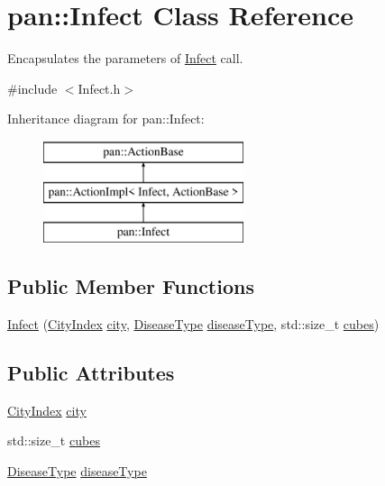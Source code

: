 \hypertarget{classpan_1_1_infect}{}\section{pan\+:\+:Infect Class Reference}
\label{classpan_1_1_infect}


Encapsulates the parameters of \hyperlink{classpan_1_1_infect}{Infect} call.  




{\ttfamily \#include $<$Infect.\+h$>$}

Inheritance diagram for pan\+:\+:Infect\+:\begin{figure}[H]
\begin{center}
\leavevmode
\includegraphics[height=3.000000cm]{classpan_1_1_infect}
\end{center}
\end{figure}
\subsection*{Public Member Functions}
\begin{DoxyCompactItemize}
\item 
\hyperlink{classpan_1_1_infect_ad6dfd4e6c39da420c65543f75c0e7d17}{Infect} (\hyperlink{namespacepan_afaed28aa6603153dcc062a028602d697}{City\+Index} \hyperlink{classpan_1_1_infect_a33fc44ae32daff748b39b2c787f2fb42}{city}, \hyperlink{namespacepan_a48851b51b0aef3f0e1be80df5031d9d7}{Disease\+Type} \hyperlink{classpan_1_1_infect_ad0a1d175916afcaf0f1050edf6536a97}{disease\+Type}, std\+::size\+\_\+t \hyperlink{classpan_1_1_infect_a3ad54add7a5021ba5fed764f8e688378}{cubes})
\end{DoxyCompactItemize}
\subsection*{Public Attributes}
\begin{DoxyCompactItemize}
\item 
\hyperlink{namespacepan_afaed28aa6603153dcc062a028602d697}{City\+Index} \hyperlink{classpan_1_1_infect_a33fc44ae32daff748b39b2c787f2fb42}{city}
\item 
std\+::size\+\_\+t \hyperlink{classpan_1_1_infect_a3ad54add7a5021ba5fed764f8e688378}{cubes}
\item 
\hyperlink{namespacepan_a48851b51b0aef3f0e1be80df5031d9d7}{Disease\+Type} \hyperlink{classpan_1_1_infect_ad0a1d175916afcaf0f1050edf6536a97}{disease\+Type}
\end{DoxyCompactItemize}


